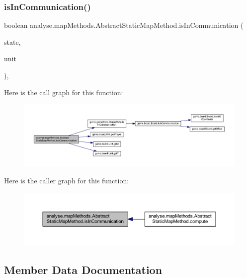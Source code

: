 \subsubsection{\texorpdfstring{is\+In\+Communication()}{isInCommunication()}}
{\footnotesize\ttfamily boolean analyse.\+map\+Methods.\+Abstract\+Static\+Map\+Method.\+is\+In\+Communication (\begin{DoxyParamCaption}\item[{\mbox{\hyperlink{classgame_1_1game_state_1_1_game_state}{Game\+State}}}]{state,  }\item[{\mbox{\hyperlink{classgame_1_1board_1_1_unit}{Unit}}}]{unit }\end{DoxyParamCaption})\hspace{0.3cm}{\ttfamily [inline]}, {\ttfamily [private]}}

Here is the call graph for this function\+:
\nopagebreak
\begin{figure}[H]
\begin{center}
\leavevmode
\includegraphics[width=350pt]{classanalyse_1_1map_methods_1_1_abstract_static_map_method_a5f92c163d4402bbd591c2673d09fbbaf_cgraph}
\end{center}
\end{figure}
Here is the caller graph for this function\+:
\nopagebreak
\begin{figure}[H]
\begin{center}
\leavevmode
\includegraphics[width=350pt]{classanalyse_1_1map_methods_1_1_abstract_static_map_method_a5f92c163d4402bbd591c2673d09fbbaf_icgraph}
\end{center}
\end{figure}


\subsection{Member Data Documentation}
\mbox{\label{classanalyse_1_1map_methods_1_1_abstract_static_map_method_ad4439fb5b50b2cc9174cc912426b876d}} 
